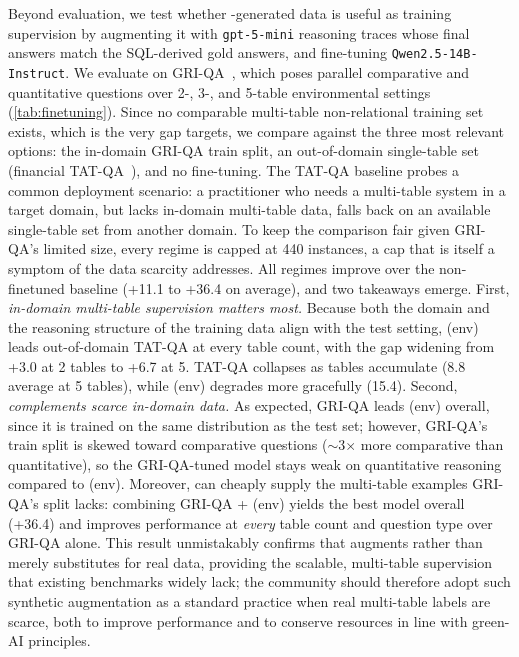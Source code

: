 Beyond evaluation, we test whether \name-generated data is useful as training supervision by augmenting it with \texttt{gpt-5-mini} reasoning traces whose final answers match the SQL-derived gold answers, and fine-tuning \texttt{Qwen2.5-14B-Instruct}. 
We evaluate on GRI-QA~\cite{1.16}, which poses parallel comparative and quantitative questions over 2-, 3-, and 5-table environmental settings (\autoref{tab:finetuning}).
Since no comparable multi-table non-relational training set exists, which is the very gap \name targets, we compare against the three most relevant options: the in-domain GRI-QA train split, an out-of-domain single-table set (financial TAT-QA~\citealp{1.9}), and no fine-tuning. The TAT-QA baseline probes a common deployment scenario: a practitioner who needs a multi-table system in a target domain, but lacks in-domain multi-table data, falls back on an available single-table set from another domain. To keep the comparison fair given GRI-QA's limited size, every regime is capped at 440 instances, a cap that is itself a symptom of the data scarcity \name addresses.
All regimes improve over the non-finetuned baseline (+11.1 to +36.4 on average), and two takeaways emerge. First, \emph{in-domain multi-table supervision matters most.} Because both the domain and the reasoning structure of the training data align with the test setting, \name (env) leads out-of-domain TAT-QA at every table count, with the gap widening from +3.0 at 2 tables to +6.7 at 5. TAT-QA collapses as tables accumulate (8.8 average at 5 tables), while \name (env) degrades more gracefully (15.4). Second, \emph{\name complements scarce in-domain data.} As expected, GRI-QA leads \name (env) overall, since it is trained on the same distribution as the test set; however, GRI-QA's train split is skewed toward comparative questions ($\sim$3$\times$ more comparative than quantitative), so the GRI-QA-tuned model stays weak on quantitative reasoning compared to \name (env). Moreover, \name can cheaply supply the multi-table examples GRI-QA's split lacks: combining GRI-QA + \name (env) yields the best model overall (+36.4) and improves performance at \emph{every} table count and question type over GRI-QA alone. This result unmistakably confirms that \name augments rather than merely substitutes for real data, providing the scalable, multi-table supervision that existing benchmarks widely lack; the community should therefore adopt such synthetic augmentation as a standard practice when real multi-table labels are scarce, both to improve performance and to conserve resources in line with green-AI principles.
